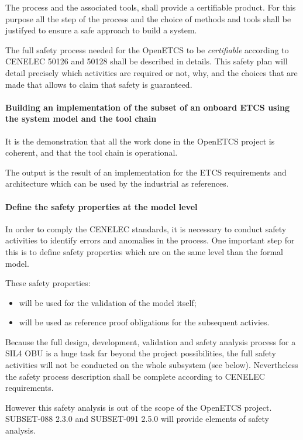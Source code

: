 The process and the associated tools, shall provide a certifiable product. For this purpose all the step of the process and the choice of methods and tools shall be justifyed to ensure a safe approach to build a system.

The full safety process needed for the OpenETCS to be \emph{certifiable} according to CENELEC 50126
and 50128 shall be described in details. This safety plan will detail precisely which activities 
are required or not, why, and the choices that are made that allows to claim that safety is guaranteed.


\paragraph{Building an implementation of the subset of an onboard ETCS using the system model and the 
tool chain}

It is the demonstration that all the work done in the OpenETCS project is coherent, and that
the tool chain is operational.

The output is the result of an implementation for the ETCS requirements and architecture which can be used by the industrial as references.

\paragraph{Define the safety properties at the model level}
In order to comply the CENELEC standards, it is necessary to conduct safety activities 
to identify errors and anomalies in the process. One important step for this is to define safety 
properties which are on the same level than the formal model.

These safety properties:
\begin{itemize}
\item will be used for the validation of the model itself;
\item will be used as reference proof obligations for the subsequent activies.
\end{itemize}

Because the full design, development, validation and safety analysis process for a SIL4 OBU
is a huge task far beyond the project possibilities, the full safety activities will not be conducted
on the whole subsystem (see below). Nevertheless the safety process description shall be complete 
according to CENELEC requirements.

However this safety analysis is out of the scope of the OpenETCS project. SUBSET-088 2.3.0 and SUBSET-091 2.5.0 will provide elements of safety analysis. 


